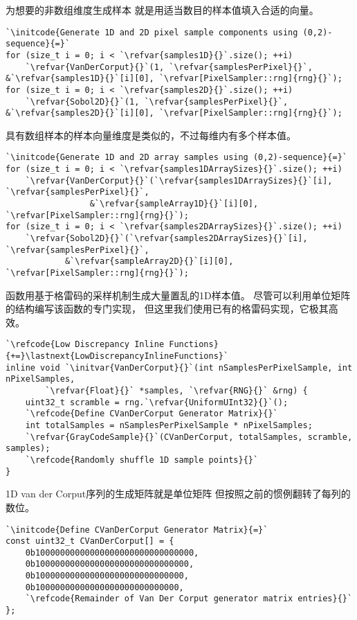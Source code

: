 为想要的非数组维度生成样本
就是用适当数目的样本值填入合适的向量。
\begin{lstlisting}
`\initcode{Generate 1D and 2D pixel sample components using (0,2)-sequence}{=}`
for (size_t i = 0; i < `\refvar{samples1D}{}`.size(); ++i)
    `\refvar{VanDerCorput}{}`(1, `\refvar{samplesPerPixel}{}`, &`\refvar{samples1D}{}`[i][0], `\refvar[PixelSampler::rng]{rng}{}`);
for (size_t i = 0; i < `\refvar{samples2D}{}`.size(); ++i)
    `\refvar{Sobol2D}{}`(1, `\refvar{samplesPerPixel}{}`, &`\refvar{samples2D}{}`[i][0], `\refvar[PixelSampler::rng]{rng}{}`);
\end{lstlisting}

具有数组样本的样本向量维度是类似的，不过每维内有多个样本值。
\begin{lstlisting}
`\initcode{Generate 1D and 2D array samples using (0,2)-sequence}{=}`
for (size_t i = 0; i < `\refvar{samples1DArraySizes}{}`.size(); ++i)
    `\refvar{VanDerCorput}{}`(`\refvar{samples1DArraySizes}{}`[i], `\refvar{samplesPerPixel}{}`,
                 &`\refvar{sampleArray1D}{}`[i][0], `\refvar[PixelSampler::rng]{rng}{}`);
for (size_t i = 0; i < `\refvar{samples2DArraySizes}{}`.size(); ++i)
    `\refvar{Sobol2D}{}`(`\refvar{samples2DArraySizes}{}`[i], `\refvar{samplesPerPixel}{}`,
            &`\refvar{sampleArray2D}{}`[i][0], `\refvar[PixelSampler::rng]{rng}{}`);
\end{lstlisting}

函数用基于格雷码的采样机制生成大量置乱的1D样本值。
尽管可以利用单位矩阵的结构编写该函数的专门实现，
但这里我们使用已有的格雷码实现，它极其高效。
\begin{lstlisting}
`\refcode{Low Discrepancy Inline Functions}{+=}\lastnext{LowDiscrepancyInlineFunctions}`
inline void `\initvar{VanDerCorput}{}`(int nSamplesPerPixelSample, int nPixelSamples,
        `\refvar{Float}{}` *samples, `\refvar{RNG}{}` &rng) {
    uint32_t scramble = rng.`\refvar{UniformUInt32}{}`();
    `\refcode{Define CVanDerCorput Generator Matrix}{}`
    int totalSamples = nSamplesPerPixelSample * nPixelSamples;
    `\refvar{GrayCodeSample}{}`(CVanDerCorput, totalSamples, scramble, samples);
    `\refcode{Randomly shuffle 1D sample points}{}`
}
\end{lstlisting}

1D van der Corput序列的生成矩阵就是单位矩阵
但按照之前的惯例翻转了每列的数位。
\begin{lstlisting}
`\initcode{Define CVanDerCorput Generator Matrix}{=}`
const uint32_t CVanDerCorput[] = {
    0b10000000000000000000000000000000,
    0b1000000000000000000000000000000,
    0b100000000000000000000000000000,
    0b10000000000000000000000000000,
    `\refcode{Remainder of Van Der Corput generator matrix entries}{}`
};
\end{lstlisting}

